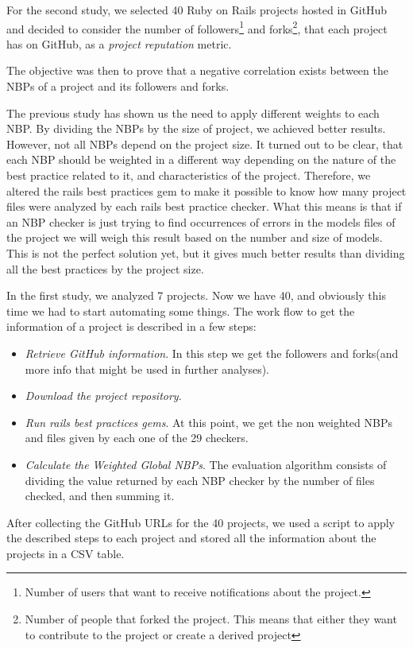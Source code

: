 For the second study, we selected 40 Ruby on Rails projects hosted in GitHub and
decided to consider the number of 
\textsf{followers}\footnote{Number of users that want to receive notifications about the project.} and
\textsf{forks}\footnote{Number of people that forked the project. This means that either they want to contribute to the project or create a derived project}, 
that each project has on GitHub, 
as a \emph{project reputation} metric. 

The objective was then to prove that a negative correlation exists between the NBPs of a project and its followers and forks. 

The previous study has shown us the need to apply different weights to each NBP. 
By dividing the NBPs by the size of project, we achieved better results.
However, not all NBPs depend on the project size.
It turned out to be clear, that each NBP should be weighted in a different way depending
on the nature of the best practice related to it, and characteristics of the project.
Therefore, we altered the rails best practices gem to make it possible to know how many project files were analyzed 
by each rails best practice checker.
What this means is that if an NBP checker is just trying to find occurrences of errors in the models files of the project
we will weigh this result based on the number and size of models.
This is not the perfect solution yet, but it gives much better results than dividing all the best practices by the project size.

In the first study, we analyzed 7 projects. Now we have 40, and obviously this time we had to start automating some things.
The work flow to get the information of a project is described in a few steps:
\begin{itemize}
\item \emph{Retrieve GitHub information}. In this step we get the followers and forks(and more info that might be used in further analyses).
\item \emph{Download the project repository}.
\item \emph{Run rails best practices gems}. At this point, we get the non weighted NBPs and files given by each one of the 29 checkers.
\item \emph{Calculate the Weighted Global NBPs}. The evaluation algorithm consists of dividing the value returned by each NBP checker  by the number of files checked, and then summing it.
\end{itemize}

After collecting the GitHub URLs for the 40 projects, we used a script to apply the described steps to each project
and stored all the information about the projects in a CSV table.

